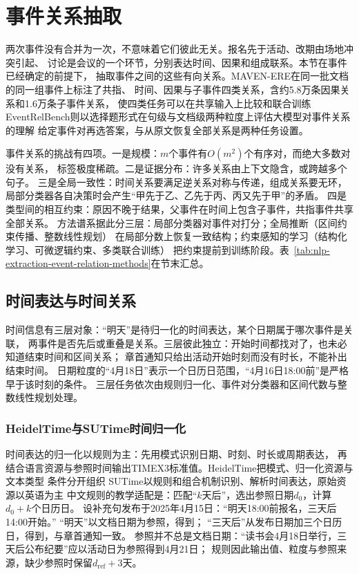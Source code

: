 \section{事件关系抽取}
\label{sec:nlp-extraction-event-relations}

两次事件没有合并为一次，不意味着它们彼此无关。报名先于活动、改期由场地冲突引起、
讨论是会议的一个环节，分别表达时间、因果和组成联系。本节在事件已经确定的前提下，
抽取事件之间的这些有向关系。MAVEN-ERE在同一批文档的同一组事件上标注了共指、
时间、因果与子事件四类关系，含约5.8万条因果关系和1.6万条子事件关系，
使四类任务可以在共享输入上比较和联合训练
EventRelBench则以选择题形式在句级与文档级两种粒度上评估大模型对事件关系的理解
给定事件对再选答案，与从原文恢复全部关系是两种任务设置。

事件关系的挑战有四项。一是规模：$m$个事件有$O(m^2)$个有序对，而绝大多数对没有关系，
标签极度稀疏。二是证据分布：许多关系由上下文隐含，或跨越多个句子。
三是全局一致性：时间关系要满足逆关系对称与传递，组成关系要无环，
局部分类器各自决策时会产生“甲先于乙、乙先于丙、丙又先于甲”的矛盾。
四是类型间的相互约束：原因不晚于结果，父事件在时间上包含子事件，共指事件共享全部关系。
方法谱系据此分三层：局部分类器对事件对打分；全局推断（区间约束传播、整数线性规划）
在局部分数上恢复一致结构；约束感知的学习（结构化学习、可微逻辑约束、多类联合训练）
把约束提前到训练阶段。表~\ref{tab:nlp-extraction-event-relation-methods}在节末汇总。

\subsection{时间表达与时间关系}
\label{sec:nlp-extraction-temporal}

时间信息有三层对象：“明天”是待归一化的时间表达，某个日期属于哪次事件是关联，
两事件是否先后或重叠是关系。三层彼此独立：开始时间都找对了，也未必知道结束时间和区间关系；
章首通知只给出活动开始时刻而没有时长，不能补出结束时间。
日期粒度的“4月18日”表示一个日历日范围，“4月16日18:00前”是严格早于该时刻的条件。
三层任务依次由规则归一化、事件对分类器和区间代数与整数线性规划处理。

\subsubsection{HeidelTime与SUTime时间归一化}
\label{sec:nlp-extraction-time-normalization}

时间表达的归一化以规则为主：先用模式识别日期、时刻、时长或周期表达，
再结合语言资源与参照时间输出TIMEX3标准值。HeidelTime把模式、归一化资源与文本类型
条件分开组织
SUTime以规则和组合机制识别、解析时间表达，原始资源以英语为主
中文规则的教学适配是：匹配“$k$天后”，选出参照日期$d_0$，计算$d_0+k$个日历日。
设补充句发布于2025年4月15日：“明天18:00前报名，三天后14:00开始。”
“明天”以文档日期为参照，得到；
“三天后”从发布日期加三个日历日，得到，与章首通知一致。
参照并不总是文档日期：“读书会4月18日举行，三天后公布纪要”应以活动日为参照得到4月21日；
规则因此输出值、粒度与参照来源，缺少参照时保留$d_{\mathrm{ref}}+3\text{天}$。

